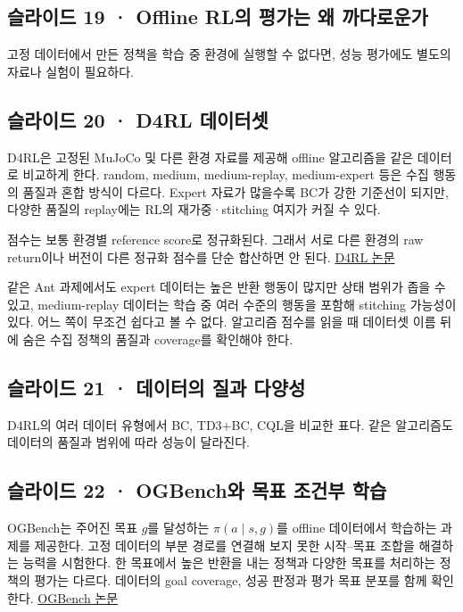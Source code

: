 \documentclass[11pt,a4paper]{article}
\begin{document}
\subsection{슬라이드 19 · Offline RL의 평가는 왜 까다로운가}

고정 데이터에서 만든 정책을 학습 중 환경에 실행할 수 없다면, 성능 평가에도 별도의 자료나 실험이 필요하다.\par

\subsection{슬라이드 20 · D4RL 데이터셋}

D4RL은 고정된 MuJoCo 및 다른 환경 자료를 제공해 offline 알고리즘을 같은 데이터로 비교하게 한다. random, medium, medium-replay, medium-expert 등은 수집 행동의 품질과 혼합 방식이 다르다. Expert 자료가 많을수록 BC가 강한 기준선이 되지만, 다양한 품질의 replay에는 RL의 재가중·stitching 여지가 커질 수 있다.\par

점수는 보통 환경별 reference score로 정규화된다. 그래서 서로 다른 환경의 raw return이나 버전이 다른 정규화 점수를 단순 합산하면 안 된다. \href{https://arxiv.org/abs/2004.07219}{D4RL 논문}\par

같은 Ant 과제에서도 expert 데이터는 높은 반환 행동이 많지만 상태 범위가 좁을 수 있고, medium-replay 데이터는 학습 중 여러 수준의 행동을 포함해 stitching 가능성이 있다. 어느 쪽이 무조건 쉽다고 볼 수 없다. 알고리즘 점수를 읽을 때 데이터셋 이름 뒤에 숨은 수집 정책의 품질과 coverage를 확인해야 한다.\par

\subsection{슬라이드 21 · 데이터의 질과 다양성}

D4RL의 여러 데이터 유형에서 BC, TD3+BC, CQL을 비교한 표다. 같은 알고리즘도 데이터의 품질과 범위에 따라 성능이 달라진다.\par

\subsection{슬라이드 22 · OGBench와 목표 조건부 학습}

OGBench는 주어진 목표 $g$를 달성하는 $\pi(a\mid s,g)$를 offline 데이터에서 학습하는 과제를 제공한다. 고정 데이터의 부분 경로를 연결해 보지 못한 시작–목표 조합을 해결하는 능력을 시험한다. 한 목표에서 높은 반환을 내는 정책과 다양한 목표를 처리하는 정책의 평가는 다르다. 데이터의 goal coverage, 성공 판정과 평가 목표 분포를 함께 확인한다. \href{https://arxiv.org/abs/2410.20092}{OGBench 논문}\par
\end{document}
